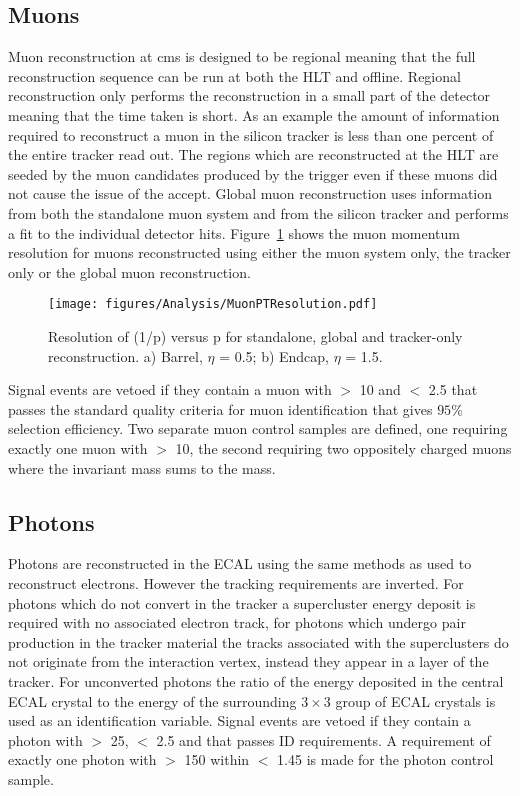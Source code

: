 \subsection{Muons} %
\label{sub:muons}
Muon reconstruction at \ac{cms} is designed to be regional meaning that the 
full reconstruction sequence can be run at both the HLT and offline. Regional 
reconstruction only performs the reconstruction in a small part of the detector 
meaning that the time taken is short. As an example the amount of information 
required to reconstruct a muon in the silicon tracker is less than one percent 
of the entire tracker read out. The regions which are reconstructed at the HLT 
are seeded by the muon candidates produced by the \Lone trigger even if these 
muons did not cause the issue of the \Lone accept. Global muon reconstruction 
uses information from both the standalone muon system and from the silicon 
tracker and performs a fit to the individual detector hits.
Figure~\ref{fig:figures_Analysis_MuonPTResolution} shows the muon momentum
resolution for muons reconstructed using either the muon system only, the 
tracker only or the global muon reconstruction.
\begin{figure}[htbp]
  \centering
    \texttt{[image: figures/Analysis/MuonPTResolution.pdf]}
  \caption{Resolution of (1/p) versus p for standalone, global and tracker-only reconstruction. a) Barrel, $\eta$ = 0.5; b) Endcap, $\eta$ = 1.5.}
  \label{fig:figures_Analysis_MuonPTResolution}
\end{figure}

Signal events are vetoed if they contain a muon with \PT $>$ \unit{10}{\GeV} 
and \mETA $<$ 2.5 that passes the standard quality criteria for muon 
identification that gives $95\%$ selection efficiency. Two 
separate muon control samples are defined, one requiring exactly one muon with 
\PT $>$ \unit{10}{\GeV}, the second requiring two oppositely charged muons where the invariant mass sums to the \PZ mass. 


\subsection{Photons} %
\label{sub:photons}
Photons are reconstructed in the ECAL using the same methods as used to reconstruct electrons. However the tracking requirements are inverted. For photons which do not convert in the tracker a supercluster energy deposit is required with no associated electron track, for photons which undergo pair production in the tracker material the tracks associated with the superclusters do not originate from the interaction vertex, instead they appear in a layer of the tracker. For unconverted photons the ratio of the energy deposited in the central ECAL crystal to the energy of the surrounding $3\times3$ group of ECAL crystals is used as an identification variable. Signal events are vetoed if they contain a photon with \ET $>$ \unit{25}{\GeV}, \mETA $<$ 2.5 and that passes ID requirements. A requirement of exactly one photon with \ET $>$ \unit{150}{\GeV} within \mETA $<$ 1.45 is made for the photon control sample.


